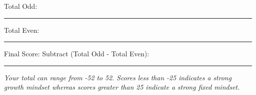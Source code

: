 \documentclass[letterpaper, 10pt]{article}
\begin{document}
Total Odd: \rule{.5in}{.01in} \hspace{0.5in} Total Even: \rule{.5in}{.01in}

\vspace{.15in}

Final Score: Subtract (Total Odd - Total Even): \rule{.5in}{.01in}

\vspace{.15in}
\textit{Your total can range from -52 to 52.  Scores less than -25 indicates a strong growth mindset whereas scores greater than 25 indicate a strong fixed mindset. }
\end{document}
